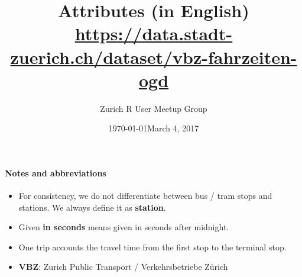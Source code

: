 \documentclass[11pt]{article}
\author{Zurich R User Meetup Group}
\date{\today}
\title{\vspace{-3ex} \textbf{Attributes (in English)} \\
	\normalsize \url{https://data.stadt-zuerich.ch/dataset/vbz-fahrzeiten-ogd}}
\date{March 4, 2017}
\begin{document}
\maketitle
\thispagestyle{fancy}



\paragraph{Notes and abbreviations}
\begin{itemize}
	\item For consistency, we do not differentiate between bus / tram stops and stations. We always define it as \textbf{station}.
	\item Given \textbf{in seconds} means given in seconds after midnight.
	\item One trip accounts the travel time from the first stop to the terminal stop.
	\item \textbf{VBZ}: Zurich Public Transport / Verkehrsbetriebe Z\"{u}rich
\end{itemize}
\end{document}
